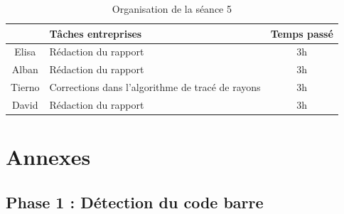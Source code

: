 \documentclass{rapport}
\begin{document}
\begin{table}[H]
	\centering 
	\begin{tabular}{c|p{12 cm}|c}
		& Tâches entreprises& Temps passé\\ \hline
		Elisa & Rédaction du rapport & 3h\\ \hline
		Alban & Rédaction du rapport & 3h\\ \hline
		Tierno & Corrections dans l'algorithme de tracé de rayons & 3h\\ \hline
		David& Rédaction du rapport & 3h \\ \hline
	\end{tabular}
	\caption{Organisation de la séance 5}
\end{table}

\newpage

\section{Annexes}

\lstset{style=mystyle}

\subsection{Phase 1 : Détection du code barre}
\end{document}
